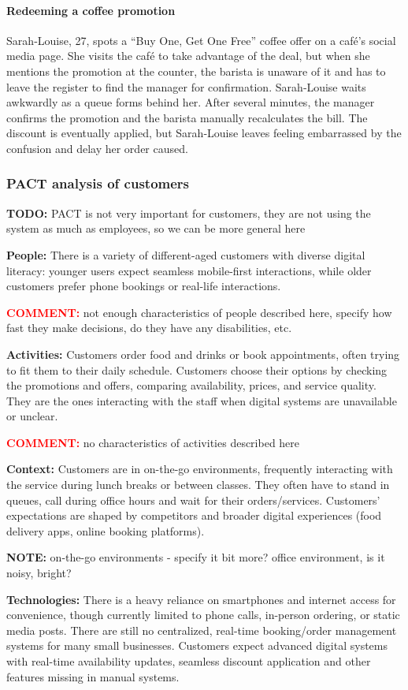 \documentclass[]{VUMIFTemplateClass}
\newcommand{\yellowcomment}[1]{%
    \begin{tcolorbox}[colback=yellow!80, colframe=yellow!80, arc=0pt, outer arc=0pt, boxrule=0pt, left=3pt, right=3pt, top=3pt, bottom=3pt]
        \textbf{\textcolor{red}{COMMENT:}} #1
    \end{tcolorbox}
}
\newcommand{\noticecomment}[1]{%
    \begin{tcolorbox}[colback=blue!20, colframe=blue!60, arc=0pt, outer arc=0pt, boxrule=1pt, left=3pt, right=3pt, top=3pt, bottom=3pt]
        \textbf{\textcolor{blue!70!black}{NOTE:}} #1
    \end{tcolorbox}
}
\newcommand{\todocomment}[1]{%
    \begin{tcolorbox}[colback=red!20, colframe=red!60, arc=0pt, outer arc=0pt, boxrule=1pt, left=3pt, right=3pt, top=3pt, bottom=3pt]
        \textbf{\textcolor{orange!70!black}{TODO:}} #1
    \end{tcolorbox}
}
\newcommand{\subsubsubsection}[1]{\paragraph{#1}}
\begin{document}
\subsubsubsection{Redeeming a coffee promotion}


Sarah‑Louise, 27, spots a “Buy One, Get One Free” coffee offer on a café’s
social media page. She visits the café to take advantage of the deal, but when
she mentions the promotion at the counter, the barista is unaware of it and has
to leave the register to find the manager for confirmation. Sarah‑Louise waits
awkwardly as a queue forms behind her. After several minutes, the manager
confirms the promotion and the barista manually recalculates the bill. The
discount is eventually applied, but Sarah‑Louise leaves feeling embarrassed by
the confusion and delay her order caused.

\subsubsection{PACT analysis of customers}
\todocomment{PACT is not very important for customers, they are not using the system as much as employees, so we can be more general here}
\textbf{People:} There is a variety of different-aged customers with diverse
digital literacy: younger users expect seamless mobile-first interactions, while
older customers prefer phone bookings or real-life interactions. 
\yellowcomment{not enough characteristics of people described here, specify how fast they make decisions, do they have any disabilities, etc. }

\textbf{Activities:} Customers order food and drinks or book appointments, often
trying to fit them to their daily schedule. Customers choose their options by
checking the promotions and offers, comparing availability, prices, and service
quality. They are the ones interacting with the staff when digital systems are
unavailable or unclear.

\yellowcomment{no characteristics of activities described here}

\textbf{Context:} Customers are in on-the-go environments, frequently
interacting with the service during lunch breaks or between classes. They often
have to stand in queues, call during office hours and wait for their
orders/services. Customers' expectations are shaped by competitors and broader
digital experiences (food delivery apps, online booking platforms).

\noticecomment{on-the-go environments - specify it bit more? office environment, is it noisy, bright?}

\textbf{Technologies:} There is a heavy reliance on smartphones and internet
access for convenience, though currently limited to phone calls, in-person
ordering, or static media posts. There are still no centralized, real-time
booking/order management systems for many small businesses. Customers expect
advanced digital systems with real-time availability updates, seamless discount
application and other features missing in manual systems.
\end{document}
